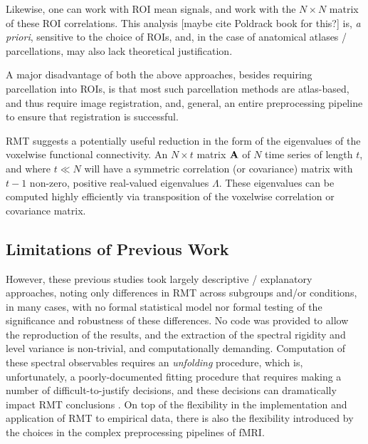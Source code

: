 \documentclass[12pt]{spieman}  %
\begin{document}
\begin{spacing}{2}
Likewise, one can work with ROI mean signals, and work with the \(N \times N\)
matrix of these ROI correlations. This analysis [maybe cite Poldrack book for
this?] is, \textit{a priori}, sensitive to the choice of ROIs, and, in the case
of anatomical atlases / parcellations, may also lack theoretical justification.

A major disadvantage of both the above approaches, besides requiring
parcellation into ROIs, is that most such parcellation methods are atlas-based,
and thus require image registration, and, general, an entire preprocessing
pipeline to ensure that registration is successful.


RMT suggests a potentially useful reduction in the form of the eigenvalues of
the voxelwise functional connectivity. An \(N \times t\) matrix \(\bf{A}\) of
\(N\) time series of length \(t\), and where \(t \ll N\) will have a symmetric
correlation (or covariance) matrix with \(t - 1\) non-zero, positive
real-valued eigenvalues \(\Lambda\). These eigenvalues can be computed highly
efficiently via transposition of the voxelwise correlation or covariance
matrix.


\subsection{Limitations of Previous Work}

However, these previous studies took largely descriptive / explanatory
approaches, noting only differences in RMT across subgroups and/or conditions,
in many cases, with no formal statistical model nor formal testing of the
significance and robustness of these differences. No code was provided to allow
the reproduction of the results, and the extraction of the spectral rigidity
and level variance is non-trivial, and computationally demanding. Computation
of these spectral observables requires an \textit{unfolding}
procedure\cite{guhrRandommatrixTheoriesQuantum1998a,mehtaRandomMatrices2004},
which is, unfortunately, a poorly-documented fitting procedure that requires
making a number of difficult-to-justify decisions, and these decisions can
dramatically impact RMT conclusions
\cite{abul-magdUnfoldingSpectrumChaotic2014,abueleninSpectralUnfoldingChaotic2018,fossionRandommatrixSpectraTime2013,abueleninEffectUnfoldingSpectral2012,moralesImprovedUnfoldingDetrending2011}.
On top of the flexibility in the implementation and application of RMT to
empirical data, there is also the flexibility introduced by the choices in the
complex preprocessing pipelines of fMRI\cite{parkerBenefitSliceTiming2019}.


\end{spacing}
\end{document}
